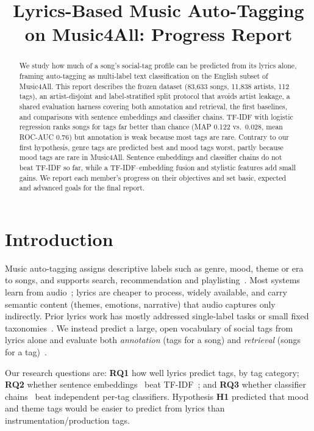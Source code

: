 \documentclass{article}
\title{Lyrics-Based Music Auto-Tagging on Music4All: Progress Report}
\begin{document}
\maketitle

\begin{abstract}
We study how much of a song's social-tag profile can be predicted from its lyrics alone, framing auto-tagging as multi-label text classification on the English subset of Music4All. This report describes the frozen dataset (83,633 songs, 11,838 artists, 112 tags), an artist-disjoint and label-stratified split protocol that avoids artist leakage, a shared evaluation harness covering both annotation and retrieval, the first baselines, and comparisons with sentence embeddings and classifier chains. TF-IDF with logistic regression ranks songs for tags far better than chance (MAP 0.122 vs.\ 0.028, mean ROC-AUC 0.76) but annotation is weak because most tags are rare. Contrary to our first hypothesis, genre tags are predicted best and mood tags worst, partly because mood tags are rare in Music4All. Sentence embeddings and classifier chains do not beat TF-IDF so far, while a TF-IDF--embedding fusion and stylistic features add small gains. We report each member's progress on their objectives and set basic, expected and advanced goals for the final report.
\end{abstract}

\section{Introduction}\label{sec:intro}

Music auto-tagging assigns descriptive labels such as genre, mood, theme or era to songs, and supports search, recommendation and playlisting~\cite{turnbull2008semantic,lamere2008social}. Most systems learn from audio~\cite{choi2017crnn}; lyrics are cheaper to process, widely available, and carry semantic content (themes, emotions, narrative) that audio captures only indirectly. Prior lyrics work has mostly addressed single-label tasks or small fixed taxonomies~\cite{mayer2011ensembles,mayer2008rhyme,hu2010when}. We instead predict a large, open vocabulary of social tags from lyrics alone and evaluate both \emph{annotation} (tags for a song) and \emph{retrieval} (songs for a tag)~\cite{turnbull2008semantic}.

Our research questions are: \textbf{RQ1} how well lyrics predict tags, by tag category; \textbf{RQ2} whether sentence embeddings~\cite{reimers2019sbert} beat TF-IDF~\cite{salton1988term}; and \textbf{RQ3} whether classifier chains~\cite{read2011chains} beat independent per-tag classifiers. Hypothesis \textbf{H1} predicted that mood and theme tags would be easier to predict from lyrics than instrumentation/production tags.
\end{document}
